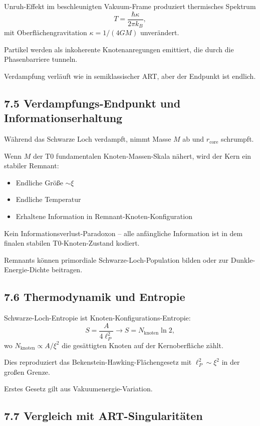 	Unruh-Effekt im beschleunigten Vakuum-Frame produziert thermisches Spektrum
	\[
	T = \frac{\hbar \kappa}{2\pi k_B},
	\]
	mit Oberflächengravitation $\kappa = 1/(4GM)$ unverändert.
	
	Partikel werden als inkoherente Knotenanregungen emittiert, die durch die Phasenbarriere tunneln.
	
	Verdampfung verläuft wie in semiklassischer ART, aber der Endpunkt ist endlich.
	
	\subsection{7.5 Verdampfungs-Endpunkt und Informationserhaltung}
	
	Während das Schwarze Loch verdampft, nimmt Masse $M$ ab und $r_{\text{core}}$ schrumpft.
	
	Wenn $M$ der T0 fundamentalen Knoten-Massen-Skala nähert, wird der Kern ein stabiler Remnant:
	\begin{itemize}
		\item Endliche Größe $\sim \xi$
		\item Endliche Temperatur
		\item Erhaltene Information in Remnant-Knoten-Konfiguration
	\end{itemize}
	
	Kein Informationsverlust-Paradoxon – alle anfängliche Information ist in dem finalen stabilen T0-Knoten-Zustand kodiert.
	
	Remnants können primordiale Schwarze-Loch-Population bilden oder zur Dunkle-Energie-Dichte beitragen.
	
	\subsection{7.6 Thermodynamik und Entropie}
	
	Schwarze-Loch-Entropie ist Knoten-Konfigurations-Entropie:
	\[
	S = \frac{A}{4 \ell_P^2} \to S = N_{\text{knoten}} \ln 2,
	\]
	wo $N_{\text{knoten}} \propto A / \xi^2$ die gesättigten Knoten auf der Kernoberfläche zählt.
	
	Dies reproduziert das Bekenstein-Hawking-Flächengesetz mit $\ell_P^2 \sim \xi^2$ in der großen Grenze.
	
	Erstes Gesetz gilt aus Vakuumenergie-Variation.
	
	\subsection{7.7 Vergleich mit ART-Singularitäten}
	
